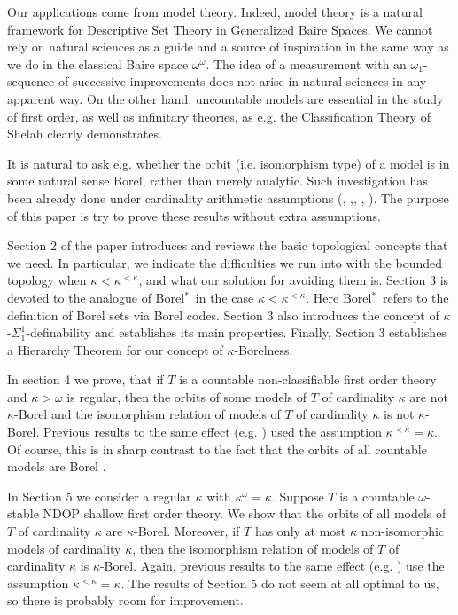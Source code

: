 \documentclass[12pt,a4paper]{amsart}
\theoremstyle{definition}
\theoremstyle{remark}
\def\borelstar{Borel\nobreak\hspace{1pt}$^*$}
\begin{document}
Our applications come from model theory. Indeed, model theory is a natural framework for Descriptive Set Theory in Generalized Baire Spaces. We cannot rely on natural sciences as  a guide and a source of inspiration in the same way as we  do in the classical Baire space $\omega^\omega$. The idea of a measurement with an $\omega_1$-sequence of successive improvements  does not arise in natural sciences in any apparent way. On the other hand, uncountable models are essential in the study of first order, as well as infinitary theories, as e.g. the Classification Theory of Shelah \cite{MR1083551} clearly demonstrates. 

It is natural to ask e.g. whether the orbit (i.e. isomorphism type) of a model is in some natural sense Borel, rather than merely analytic. Such investigation has been already done under cardinality arithmetic assumptions (\cite{MR1111753}, \cite{MR3235820},\cite{MR3724375}, \cite{MR4194559}, \cite{MR4855463}). The purpose of this paper is try to prove these results without extra assumptions.

Section 2 of the paper introduces and reviews the basic topological concepts that we need. In particular, we indicate the difficulties we run into with the bounded topology when $\kappa<\kappa^{<\kappa}$, and what our solution for avoiding them is. Section 3 is devoted to the analogue of \borelstar\ in the case $\kappa<\kappa^{<\kappa}$. Here \borelstar\ refers to the definition of Borel sets via Borel codes. Section 3 also introduces the concept of $\kappa$-$\Sigma^1_1$-definability and establishes its main properties. Finally, Section 3 establishes a Hierarchy Theorem for our concept of $\kappa$-Borelness.

In section 4 we prove, that if $T$ is a countable non-classifiable first order theory and $\kappa>\omega$ is regular, then the orbits of some models of $T$ of cardinality $\kappa$ are not $\kappa$-Borel and the isomorphism relation of models of $T$ of cardinality $\kappa$ is not $\kappa$-Borel. Previous results to the same effect (e.g. \cite{MR3235820}) used the assumption $\kappa^{<\kappa}=\kappa$. Of course, this is in sharp contrast to the fact that the orbits of all countable models are Borel \cite{MR200133}. 

In Section 5 we consider a regular $\kappa$ with $\kappa^\omega=\kappa$. Suppose $T$ is a countable $\omega$-stable NDOP shallow first order theory. We show that the orbits of all models of $T$ of cardinality $\kappa$ are $\kappa$-Borel. Moreover, if $T$ has only at most $\kappa$ non-isomorphic models of cardinality $\kappa$, then  the isomorphism relation of models of $T$ of cardinality $\kappa$ is  $\kappa$-Borel. Again,  previous results to the same effect (e.g. \cite{MR3235820}) use the assumption $\kappa^{<\kappa}=\kappa$. The results of Section 5 do not seem at all optimal to us, so there is probably  room for improvement.
\end{document}
